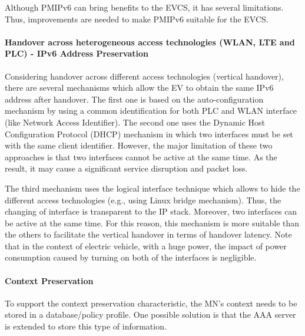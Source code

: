 Although PMIPv6 can bring benefits to the EVCS, it has several limitations. Thus, improvements are needed to make PMIPv6 suitable for the EVCS.
\paragraph{Handover across heterogeneous access technologies (WLAN, LTE and PLC) - IPv6 Address Preservation} Considering handover across different access technologies (vertical handover), there are several mechanisms which allow the EV to obtain the same IPv6 address after handover. The first one is based on the auto-configuration mechanism by using a common identification for both PLC and WLAN interface (like Network Access Identifier). The second one uses the Dynamic Host Configuration Protocol (DHCP) mechanism in which two interfaces must be set with the same client identifier. However, the major limitation of these two approaches is that two interfaces cannot be active at the same time. As the result, it may cause a significant service disruption and packet loss. 
    
The third mechanism uses the logical interface technique \cite{logical_inteface} which allows to hide the different access technologies (e.g., using Linux bridge mechanism). Thus, the changing of interface is transparent to the IP stack. Moreover, two interfaces can be active at the same time. For this reason, this mechanism is more suitable than the others to facilitate the vertical handover in terms of handover latency. Note that in the context of electric vehicle, with a huge power, the impact of power consumption caused by turning on both of the interfaces is negligible. 
\paragraph{Context Preservation} To support the context preservation characteristic, the MN's context needs to be stored in a database/policy profile. One possible solution is that the AAA server is extended to store this type of information. 

